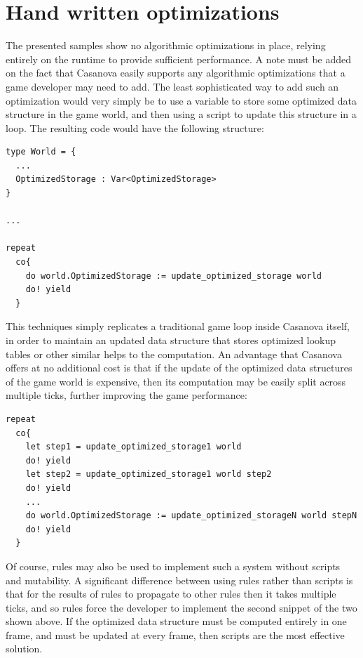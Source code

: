 \section{Hand written optimizations}
The presented samples show no algorithmic optimizations in place, relying entirely on the runtime to provide sufficient performance. A note must be added on the fact that Casanova easily supports any algorithmic optimizations that a game developer may need to add. The least sophisticated way to add such an optimization would very simply be to use a variable to store some optimized data structure in the game world, and then using a script to update this structure in a loop. The resulting code would have the following structure:

\begin{lstlisting}
type World = {
  ...
  OptimizedStorage : Var<OptimizedStorage>
}

...

repeat
  co{ 
    do world.OptimizedStorage := update_optimized_storage world
    do! yield  
  }
\end{lstlisting}

This techniques simply replicates a traditional game loop inside Casanova itself, in order to maintain an updated data structure that stores optimized lookup tables or other similar helps to the computation. An advantage that Casanova offers at no additional cost is that if the update of the optimized data structures of the game world is expensive, then its computation may be easily split across multiple ticks, further improving the game performance:

\begin{lstlisting}
repeat
  co{
    let step1 = update_optimized_storage1 world
    do! yield
    let step2 = update_optimized_storage1 world step2
    do! yield
    ...
    do world.OptimizedStorage := update_optimized_storageN world stepN
    do! yield  
  }
\end{lstlisting}

Of course, rules may also be used to implement such a system without scripts and mutability. A significant difference between using rules rather than scripts is that for the results of rules to propagate to other rules then it takes multiple ticks, and so rules force the developer to implement the second snippet of the two shown above. If the optimized data structure must be computed entirely in one frame, and must be updated at every frame, then scripts are the most effective solution.

